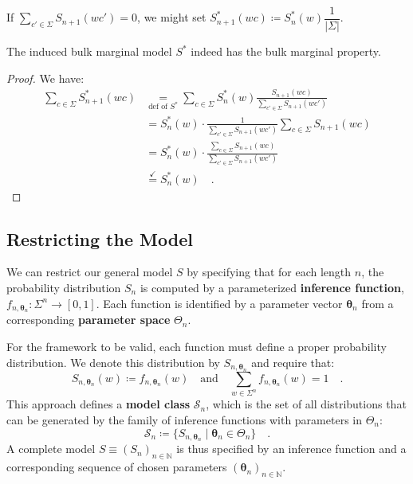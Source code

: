 \documentclass[../../main.tex]{subfiles}
\begin{document}
    \begin{remark}
        If $\sum_{c' \in \Sigma} S_{n+1}(wc') = 0$, we might set $S_{n + 1}^*(wc) \coloneqq S_n^*(w) \dfrac{1}{|\Sigma|}$.
    \end{remark}

    \begin{lemma}
        The induced bulk marginal model $S^*$ indeed has the bulk marginal property.
    \end{lemma}
    \vspace{-2.5em}
    \begin{proof}
        We have:
        \begin{align*}
            \sum_{c \in \Sigma} S_{n + 1}^*(wc) 
            &\underset{\text{def of } S^*}{=} \sum_{c \in \Sigma} S_n^*(w) \frac{S_{n+1}(wc)}{\sum_{c' \in \Sigma} S_{n+1}(wc')} \\
            &= S_n^*(w) \cdot \frac{1}{\sum_{c' \in \Sigma} S_{n+1}(wc')} \sum_{c \in \Sigma} S_{n+1}(wc) \\
            &= S_n^*(w) \cdot \frac{\sum_{c \in \Sigma} S_{n+1}(wc)}{\sum_{c' \in \Sigma} S_{n+1}(wc')} \\
            &\overset{\checkmark}{=} S_n^*(w) \quad .
        \end{align*}
    \end{proof}

\subsection{Restricting the Model}
    We can restrict our general model $S$ by specifying that for each length $n$, the probability distribution $S_n$ is computed by a parameterized \textbf{inference function}, $f_{n, \bm{\theta}_n}: \Sigma^n \to [0, 1]$. Each function is identified by a parameter vector $\bm{\theta}_n$ from a corresponding \textbf{parameter space} $\Theta_n$.

    For the framework to be valid, each function must define a proper probability distribution. We denote this distribution by $S_{n, \bm{\theta}_n}$ and require that:
    \[
        S_{n, \bm{\theta}_n}(w) \coloneqq f_{n, \bm{\theta}_n}(w) \quad \text{and} \quad \sum_{w \in \Sigma^n} f_{n, \bm{\theta}_n}(w) = 1 \quad .
    \]
    This approach defines a \textbf{model class} $\mathcal{S}_n$, which is the set of all distributions that can be generated by the family of inference functions with parameters in $\Theta_n$:
    \[
        \mathcal{S}_n \coloneqq \{ S_{n, \bm{\theta}_n} \mid \bm{\theta}_n \in \Theta_n \} \quad .
    \]
    A complete model $S \equiv (S_n)_{n \in \mathbb{N}}$ is thus specified by an inference function and a corresponding sequence of chosen parameters $(\bm{\theta}_n)_{n \in \mathbb{N}}$.
\end{document}
